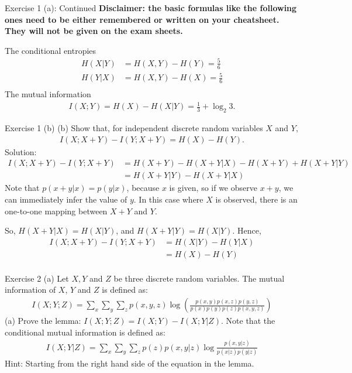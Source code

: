 \documentclass[aspectratio=169]{beamer}
\newcommand{\etpx}{H(X)}
\newcommand{\etpy}{H(Y)}
\newcommand{\etpxy}{H(X, Y)}
\newcommand{\etpycx}{H(Y|X)}
\newcommand{\etpxcy}{H(X|Y)}
\newcommand{\mixy}{I(X; Y)}
\newcommand{\mixyz}{I(X;Y;Z)}
\newcommand{\mixycz}{I(X;Y|Z)}
\newcommand{\px}{p(x)}
\newcommand{\py}{p(y)}
\newcommand{\pz}{p(z)}
\newcommand{\pxy}{p(x,y)}
\newcommand{\pxz}{p(x, z)}
\newcommand{\pyz}{p(y, z)}
\newcommand{\pxyz}{p(x, y, z)}
\newcommand{\pxycz}{p(x, y | z)}
\newcommand{\pxcz}{p(x|z)}
\newcommand{\pycz}{p(y|z)}
\begin{document}
\begin{frame}{Exercise 1 (a): Continued}
	\textbf{Disclaimer: the basic formulas like the following ones need to be either remembered or written on your cheatsheet. They will not be given on the exam sheets.}
	
	The conditional entropies
	\begin{align*}
		\etpxcy &= \etpxy - \etpy = \frac{5}{6} \\
		\etpycx & = \etpxy - \etpx = \frac{5}{6} \\
	\end{align*}
	The mutual information 
	\begin{align*}
		\mixy = \etpx - \etpxcy = \frac{1}{3} + \log_2 3.
	\end{align*}
\end{frame}

\begin{frame}{Exercise 1 (b)}
	(b) Show that, for independent discrete random variables $X$ and $Y$, 
	\begin{align*}
		I(X; X + Y) - I(Y; X + Y) = H(X) - H(Y).
	\end{align*}
	Solution: 
	\begin{align*}
		I(X; X + Y) - I(Y; X + Y) &= H(X+Y) - H(X+Y |X) - H(X+Y) + H(X+Y|Y) \\
		&= H(X+Y|Y) - H(X+Y|X)
	\end{align*}
	Note that $p(x + y | x) = p(y|x)$, because $x$ is given, so if we observe $x+y$, we can immediately infer the value of $y$. In this case where $X$ is observed, there is an one-to-one mapping between $X+Y$ and $Y$.
	
	So, $H(X+Y|X) = H(X|Y)$, and $H(X+Y|Y) = H(X|Y)$. Hence,
	\begin{align*}
		I(X; X + Y) - I(Y; X + Y) &= H(X|Y) - H(Y|X) \\
			& = H(X) - H(Y) \\
	\end{align*}
	
\end{frame}

\begin{frame}{Exercise 2 (a)}
	Let $X, Y$ and $Z$ be three discrete random variables. The mutual information of $X$, $Y$ and $Z$ is defined as:
	\begin{align*}
		\mixyz = \sum_x \sum_y \sum_z \pxyz \log \left(\frac{\pxy \pxz \pyz}{\px \py \pz \pxyz} \right)
	\end{align*}
	(a) Prove the lemma: $\mixyz = \mixy - \mixycz$. Note that the conditional mutual information is defined as:
	\begin{align*}
		\mixycz = \sum_x \sum_y \sum_z \pz \pxycz \log \frac{\pxycz}{\pxcz \pycz}
	\end{align*}
	Hint: Starting from the right hand side of the equation in the lemma.
\end{frame}
\end{document}
